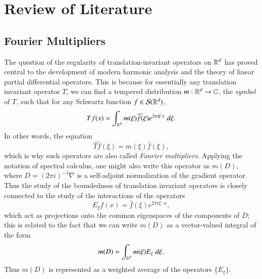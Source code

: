 


\part{Review of Literature}

\chapter{Fourier Multipliers}

The question of the regularity of translation-invariant operators on $\operatorname{\mathbb{R}}^d$ has proved central to the development of modern harmonic analysis and the theory of linear partial differential operators. This is because for essentially any translation invariant operator $T$, we can find a tempered distribution $m: \operatorname{\mathbb{R}}^d \to \operatorname{\mathbb{C}}$, the \emph{symbol} of $T$, such that for any Schwartz function $f \in \mathcal{S}(\operatorname{\mathbb{R}}^d)$,
%
\[ Tf(x) = \int_{\operatorname{\mathbb{R}}^d} m(\xi) \widehat{f}(\xi) e^{2 \pi i \xi \cdot x}\; d\xi. \]
%
In other words, the equation
%
\[ \widehat{Tf}(\xi) = m(\xi) \widehat{f}(\xi), \]
%
which is why such operators are also called \emph{Fourier multipliers}. Applying the notation of spectral calculus, one might also write this operator as $m(D)$, where $D = (2 \pi i)^{-1} \nabla$ is a self-adjoint normalization of the gradient operator. Thus the study of the boundedness of translation invariant operators is closely connected to the study of the interactions of the operators
%
\[ E_\xi f(x) = \widehat{f}(\xi) e^{2 \pi i \xi \cdot x}, \]
%
which act as projections onto the common eigenspaces of the components of $D$; this is related to the fact that we can write $m(D)$ as a vector-valued integral of the form
%
\[ m(D) = \int_{\operatorname{\mathbb{R}}^d} m(\xi) E_\xi\; d\xi. \]
%
Thus $m(D)$ is represented as a weighted average of the operators $\{ E_\xi \}$.

